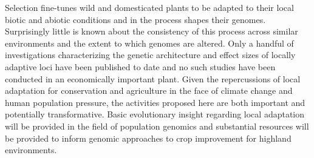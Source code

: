 
%


Selection fine-tunes wild and domesticated plants to be adapted to their local biotic and abiotic conditions and in the process shapes their genomes.  Surprisingly little is known about the consistency of this process across similar environments and the extent to which genomes are altered. Only a handful of investigations characterizing the genetic architecture and effect sizes of locally adaptive loci have been published to date and no such studies have been conducted in an economically important plant. Given the repercussions of local adaptation for conservation and agriculture in the face of climate change and human population pressure, the activities proposed here are both important and potentially transformative.  Basic evolutionary insight regarding local adaptation will be provided in the field of population genomics and substantial resources will be provided to inform genomic approaches to crop improvement for highland environments.



